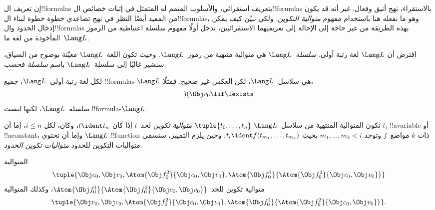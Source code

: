 \documentclass[../../../include/open-logic-section]{subfiles}
\begin{document}


إن تعريف ال!!{formula}s بتعريف استقرائي، والأسلوب المتمم له المتمثل
في إثبات خصائص ال!!{formula}s بالاستقراء، نهج أنيق وفعال. غير أنه قد
يكون من المفيد أيضًا النظر في نهج تصاعدي خطوة خطوة لبناء
ال!!{formula}s، وهو ما نفعله هنا باستخدام مفهوم \emph{متوالية
التكوين}.
%
ولكي نبيّن كيف يمكن إدخال الحدود وال!!{formula}s بهذه الطريقة من غير
حاجة إلى الإحالة إلى تعريفيهما الاستقرائيين، ندخل أولًا مفهوم سلسلة
اعتباطية من الرموز المأخوذة من لغة ما~$\Lang L$.

\begin{defn}[السلاسل]
افترض أن $\Lang L$ لغة رتبة أولى. \emph{سلسلة~$\Lang L$} هي
متوالية منتهية من رموز~$\Lang L$. وحيث تكون اللغة~$\Lang L$ معيّنة
بوضوح من السياق، سنشير غالبًا إلى سلسلة~$\Lang L$ باسم
\emph{سلسلة} فحسب.
\end{defn}

\begin{ex}
لكل لغة رتبة أولى~$\Lang L$، جميع
!!{formula}s-$\Lang L$ هي سلاسل~$\Lang L$، لكن العكس غير صحيح.
فمثلًا، \[)(\Obj v_0\lif\lexists\] سلسلة~$\Lang L$، لكنها ليست
!!{formula}-$\Lang L$.
\end{ex}

\begin{defn}
تكون المتوالية المنتهية من سلاسل~$\Lang L$
$\tuple{t_0,\dotsc,t_n}$ \emph{متوالية تكوين} لحد~$t$ إذا كان
$t \ident t_n$، وكان، لكل $i \leq n$، إما أن $t_i$ !!a{variable}
أو !!a{constant}، وإما أن تحتوي $\Lang L$ !!{function} ذات
$k$ مواضع~$f$ وتوجد $m_1,\dotsc,m_k < i$ بحيث
$t_i \ident f(t_{m_1},\dotsc,t_{m_k})$. وحين يلزم التمييز، سنسمي
متواليات التكوين للحدود \emph{متواليات تكوين الحدود}.
\end{defn}

\begin{ex}
المتوالية
\[
    \tuple{\Obj c_0, \Obj v_0, \Atom{\Obj f^2_0}{\Obj c_0, \Obj v_0}, \Atom{\Obj f^1_0}{\Atom{\Obj f^2_0}{\Obj c_0, \Obj v_0}}}
\]
متوالية تكوين للحد~$\Atom{\Obj f^1_0}{\Atom{\Obj
f^2_0}{\Obj c_0, \Obj v_0}}$، وكذلك المتوالية
\[
    \tuple{\Obj v_0, \Obj c_0, \Atom{\Obj f^2_0}{\Obj c_0, \Obj v_0}, \Atom{\Obj f^1_0}{\Atom{\Obj f^2_0}{\Obj c_0, \Obj v_0}}}.
\]
\end{ex}
\end{document}
